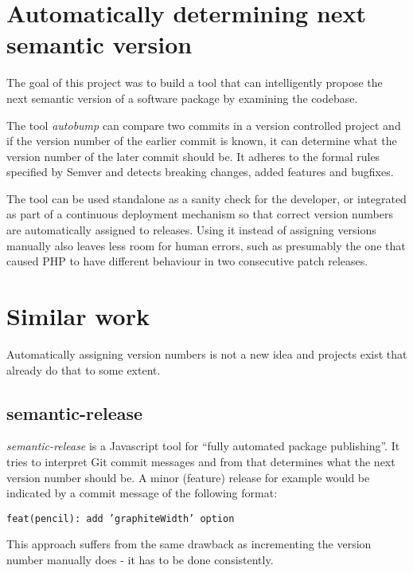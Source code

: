 \documentclass{l4proj}
\begin{document}
\section{Automatically determining next semantic version}
The goal of this project was to build a tool that can intelligently propose
the next semantic version of a software package by examining the codebase.

The tool \textit{autobump} can compare two commits in a version controlled
project and if the version number of the earlier commit is known, it can determine
what the version number of the later commit should be. It adheres to the formal
rules specified by Semver\cite{SemanticVersioning} and detects breaking changes,
added features and bugfixes.


The tool can be used standalone as a sanity check for the developer, or integrated
as part of a continuous deployment mechanism so that correct version numbers are
automatically assigned to releases. Using it instead of assigning versions manually
also leaves less room for human errors, such as presumably the one that caused PHP
to have different behaviour in two consecutive patch releases.


\section{Similar work}
Automatically assigning version numbers is not a new idea and projects
exist that already do that to some extent.

\subsection{semantic-release}

\textit{semantic-release}\cite{SemanticRelease} is a Javascript tool
for ``fully automated package publishing''. It tries to interpret Git
commit messages and from that determines what the next version number
should be. A minor (feature) release for example would be indicated by
a commit message of the following format:
\begin{center}
\texttt{feat(pencil): add 'graphiteWidth' option}
\end{center}
This approach suffers from the same drawback as incrementing the
version number manually does - it has to be done consistently.
\end{document}
